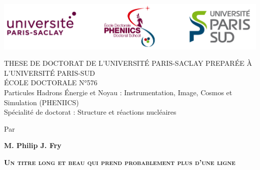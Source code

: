 \documentclass[12pt]{article}
\begin{document}

\usetikzlibrary{calc}
\thispagestyle{empty}


{\begin{center}
	\vspace{-3.5cm}
	\includegraphics[width=14cm]{Logo_ALL.png}\\
	\vspace{1cm}
	
	\textcolor{violet!80!red!80!black}{{{\uppercase{\Large These de Doctorat de L'Universit\'{e} Paris-Saclay Prepar\'{e}e \`{a} l'Universit\'{e} Paris-Sud}}}}\\
	\vspace{1cm}
	\'{E}COLE DOCTORALE N°576\\
	Particules Hadrons \'{E}nergie et Noyau : Instrumentation, Image, Cosmos et Simulation (PHENIICS)\\
	Sp\'{e}cialit\'{e} de doctorat : Structure et r\'{e}actions nucl\'{e}aires\par
	\vspace{1.5cm}
 	Par\par  \large \textbf{M. Philip J. Fry} \par
	\vspace{1cm}
	\Large \textsc{\textcolor{SchoolColor}{
	\textbf{Un titre long et beau qui prend probablement plus d'une ligne}}}\par
\end{center}

}
\end{document}
